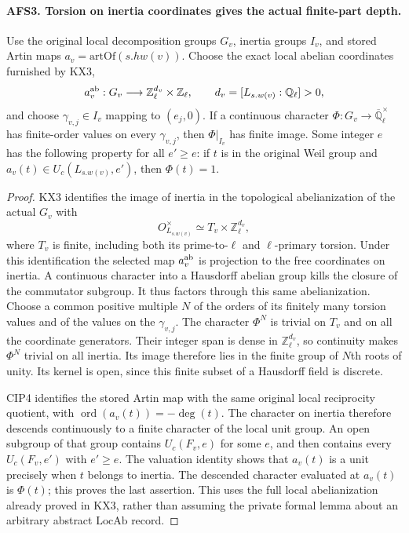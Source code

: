 \paragraph{AFS3. Torsion on inertia coordinates gives the actual finite-part depth.}
\label{claim:AFS3}
Use the original local decomposition groups $G_v$, inertia groups
$I_v$, and stored Artin maps $a_v=\mathrm{artOf}(s.hw(v))$.
Choose the exact local abelian coordinates furnished by KX3,
\[
 a_v^{\rm ab}:G_v\longrightarrow
            \mathbb Z_\ell^{d_v}\times\mathbb Z_\ell,
 \qquad d_v=[L_{s.w(v)}:\mathbb Q_\ell]>0,
\]
and choose $\gamma_{v,j}\in I_v$ mapping to $(e_j,0)$.
If a continuous character
$\Phi:G_v\to\overline{\mathbb Q}_\ell^{\times}$ has finite-order
values on every $\gamma_{v,j}$, then $\Phi|_{I_v}$ has finite
image.  Some integer $e$ has the following property for all
$e'\geq e$: if $t$ is in the original Weil group and
$a_v(t)\in U_c(L_{s.w(v)},e')$, then $\Phi(t)=1$.
\begin{proof}
KX3 identifies the image of inertia in the topological
abelianization of the actual $G_v$ with
\[
  O_{L_{s.w(v)}}^{\times}\simeq
       T_v\times\mathbb Z_\ell^{d_v},
\]
where $T_v$ is finite, including both its prime-to-$\ell$ and
$\ell$-primary torsion.  Under this identification the selected
map $a_v^{\rm ab}$ is projection to the free coordinates on
inertia.  A continuous character into a Hausdorff abelian group
kills the closure of the commutator subgroup.  It thus factors
through this same abelianization.  Choose a common positive
multiple $N$ of the orders of its finitely many torsion values
and of the values on the $\gamma_{v,j}$.  The character $\Phi^N$
is trivial on $T_v$ and on all the coordinate generators.
Their integer span is dense in $\mathbb Z_\ell^{d_v}$, so
continuity makes $\Phi^N$ trivial on all inertia.  Its image
therefore lies in the finite group of $N$th roots of unity.
Its kernel is open, since this finite subset of a Hausdorff
field is discrete.

CIP4 identifies the stored Artin map with the same original
local reciprocity quotient, with
$\operatorname{ord}(a_v(t))=-\deg(t)$.  The character on inertia
therefore descends continuously to a finite character of the
local unit group.  An open subgroup of that group contains
$U_c(F_v,e)$ for some $e$, and then contains every
$U_c(F_v,e')$ with $e'\geq e$.  The valuation identity shows
that $a_v(t)$ is a unit precisely when $t$ belongs to inertia.
The descended character evaluated at $a_v(t)$ is $\Phi(t)$;
this proves the last assertion.  This uses the full local
abelianization already proved in KX3, rather than assuming
the private formal lemma about an arbitrary abstract
$\mathrm{LocAb}$ record.
\end{proof}

